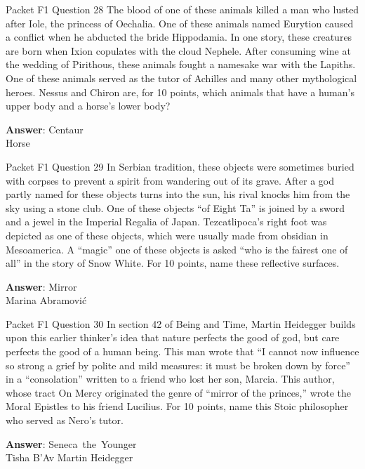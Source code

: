 \begin{frame}{Packet F1 Question 28}
The blood of one of these animals killed a man who lusted after Iole, the princess of Oechalia. One of these animals named Eurytion caused a conflict when he abducted the bride Hippodamia. In one story,   these creatures are born when Ixion copulates   with the cloud Nephele. After consuming wine at the wedding of Pirithous,   these animals fought a namesake war with the Lapiths. One of these animals served as the tutor of Achilles and many other mythological heroes. Nessus and Chiron are, for 10 points, which animals that have a human’s upper body and a horse’s lower body?  

\textbf{Answer}: Centaur\\
 Horse
\end{frame}

\begin{frame}{Packet F1 Question 29}
In Serbian tradition, these objects were sometimes   buried with corpses to prevent a spirit from wandering out of its grave. After a god partly named for these objects   turns into the sun, his rival knocks him from the sky using a stone club. One of these objects “of Eight Ta” is joined by a sword and a jewel in the Imperial Regalia of Japan. Tezcatlipoca’s right foot was depicted as one of these objects, which were usually made from obsidian in Mesoamerica. A   “magic” one of these   objects is asked “who is the fairest one of all” in the story of Snow White. For 10 points, name these reflective surfaces.

\textbf{Answer}: Mirror\\
 Marina Abramović
\end{frame}

\begin{frame}{Packet F1 Question 30}
In section 42 of Being   and Time, Martin Heidegger   builds upon this earlier thinker’s idea that nature perfects the good of god, but care perfects the good of a human being. This man wrote that “I cannot now influence so strong a grief by polite and mild measures: it must be broken down by force” in a “consolation” written to a friend who lost her son, Marcia. This author, whose tract On Mercy originated the genre of “mirror of the princes,” wrote the Moral Epistles to his friend Lucilius. For 10 points,   name this Stoic philosopher who served   as Nero’s tutor.

\textbf{Answer}: Seneca\ the\ Younger\\
 Tisha B'Av
 Martin Heidegger
\end{frame}

